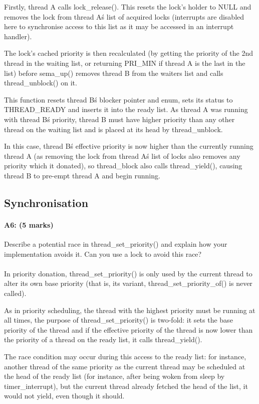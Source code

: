 Firstly, thread A calls lock\_release(). This resets the lock's holder to NULL and removes the lock from thread A\'s list of acquired locks (interrupts are disabled here to synchronise access to this list as it may be accessed in an interrupt handler).

The lock's cached priority is then recalculated (by getting the priority of the 2nd thread in the waiting list, or returning PRI\_MIN if thread A is the last in the list) before sema\_up() removes thread B from the waiters list and calls thread\_unblock() on it.

This function resets thread B\'s blocker pointer and enum, sets its status to THREAD\_READY and inserts it into the ready list.
As thread A was running with thread B\'s priority, thread B must have higher priority than any other thread on the waiting list and is placed at its head by thread\_unblock.

In this case, thread B\'s effective priority is now higher than the currently running thread A (as removing the lock from thread A\'s list of locks also removes any priority which it donated), so thread\_block also calls thread\_yield(), causing thread B to pre-empt thread A and begin running.

\subsection{Synchronisation}
\paragraph{A6: (5 marks)}
Describe a potential race in thread\_set\_priority() and explain how your implementation avoids it.  Can you use a lock to avoid this race?
\\
\\
In priority donation, thread\_set\_priority() is only used by the current thread to alter its own base priority (that is, its variant, thread\_set\_priority\_of() is never called).

As in priority scheduling, the thread with the highest priority must be running at all times, the purpose of thread\_set\_priority() is two-fold: it sets the base priority of the thread and if the effective priority of the thread is now lower than the priority of a thread on the ready list, it calls thread\_yield().

The race condition may occur during this access to the ready list: for instance, another thread of the same priority as the current thread may be scheduled at the head of the ready list (for instance, after being woken from sleep by timer\_interrupt), but the current thread already fetched the head of the list, it would not yield, even though it should.

